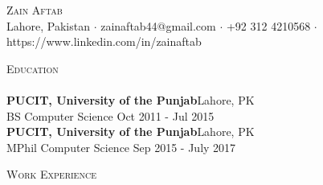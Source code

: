 \documentclass[a4paper]{article}
\newcommand{\lineunder} {
    \vspace*{-8pt} \\
    \hspace*{-18pt} \hrulefill \\
}
\newcommand{\header} [1] {
    {\hspace*{-18pt}\vspace*{6pt} \textsc{#1}}
    \vspace*{-6pt} \lineunder
}
\begin{document}
\vspace*{-40pt}

    

\vspace*{-10pt}
\begin{center}
	{\Huge \scshape {Zain Aftab}}\\
	Lahore, Pakistan $\cdot$ zainaftab44@gmail.com $\cdot$ +92 312 4210568 $\cdot$ https://www.linkedin.com/in/zainaftab\\
\end{center}

\header{Education}
\textbf{PUCIT, University of the Punjab}\hfill Lahore, PK\\
BS Computer Science \hfill Oct 2011 - Jul 2015\\
\vspace{2mm}
\textbf{PUCIT, University of the Punjab}\hfill Lahore, PK\\
MPhil Computer Science \hfill Sep 2015 - July 2017\\
\vspace{2mm}

\header{Work Experience}
\vspace{1mm}
\end{document}
